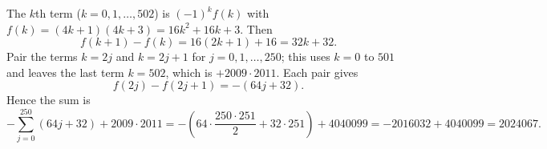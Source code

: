 The $k$th term ($k=0,1,\dots,502$) is $(-1)^kf(k)$ with $f(k)=(4k+1)(4k+3)=16k^2+16k+3$. Then
\[
f(k+1)-f(k)=16(2k+1)+16=32k+32 .
\]
Pair the terms $k=2j$ and $k=2j+1$ for $j=0,1,\dots,250$; this uses $k=0$ to $501$ and leaves the last term $k=502$, which is $+2009\cdot2011$. Each pair gives
\[
f(2j)-f(2j+1)=-(64j+32).
\]
Hence the sum is
\[
-\sum_{j=0}^{250}(64j+32)+2009\cdot2011=-\left(64\cdot\dfrac{250\cdot251}{2}+32\cdot251\right)+4040099=-2016032+4040099=\boxed{2024067}.
\]
